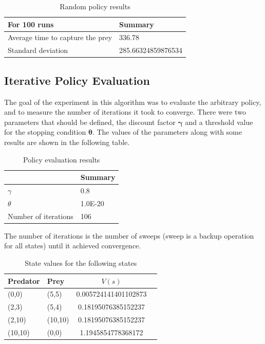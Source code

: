 \documentclass[paper=a4, fontsize=11pt]{scrartcl}
\numberwithin{equation}{section}		%
\numberwithin{figure}{section}			%
\numberwithin{table}{section}				%
\begin{document}
\begin{table}[H]
\caption{Random policy results}
\centering
    \begin{tabular}{| l || l |}
    \hline
     For 100 runs & Summary \\ \hline
    Average time to capture the prey & 336.78\\ \hline
    Standard deviation & 285.66324859876534 \\
    \hline
    \end{tabular}
    \label{random}
\end{table}

\subsection{Iterative Policy Evaluation}
The goal of the experiment in this algorithm was to evaluate the arbitrary policy, and to measure the number of iterations it took to converge. There were two parameters that should be defined, the discount factor $\mathbf{\gamma}$ and a threshold value for the stopping condition $\mathbf{\theta}$. The values of the parameters along with some results are shown in the following table.
\begin{table}[H]
\caption{Policy evaluation results}
\label{PE parameter}
\centering
    \begin{tabular}{| l || l |}
    \hline
      & Summary \\ \hline
    $\gamma$ & 0.8 \\ \hline
    $\theta$ & 1.0E-20 \\ \hline
    Number of iterations & 106 \\
    \hline
    \end{tabular} 
\end{table}
The number of iterations is the number of sweeps (sweep is a backup operation for all states) until it achieved convergence.
\begin{table}[H]
\caption{State values for the following states}
\label{PE states values}
\centering
\begin{tabular}{| l  |  l || c | r |}
  \hline
  Predator & Prey & $V(s)$ \\ \hline
  (0,0) & (5,5) & 0.005724141401102873 \\ \hline
  (2,3) & (5,4) & 0.18195076385152237 \\ \hline
  (2,10) & (10,10) & 0.18195076385152237 \\ \hline
  (10,10) & (0,0) & 1.1945854778368172 \\
  \hline  
\end{tabular}
\end{table}
\end{document}
